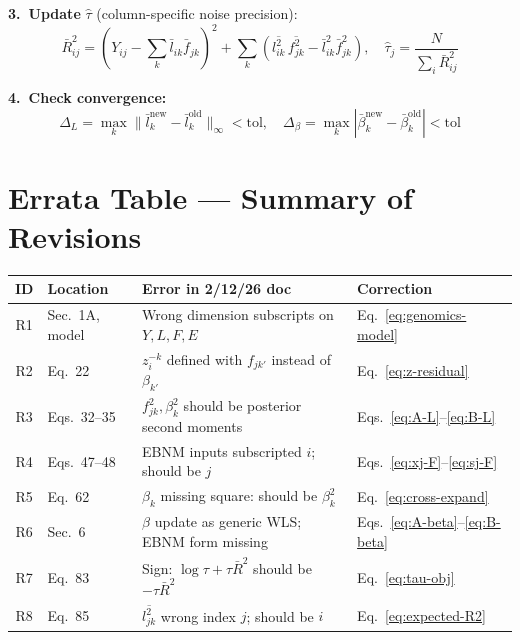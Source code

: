 \documentclass[11pt]{article}
\newcommand{\lbar}[2]{\bar{l}_{#1#2}}
\newcommand{\fbar}[2]{\bar{f}_{#1#2}}
\newcommand{\betabar}[1]{\bar{\beta}_{#1}}
\newcommand{\lsec}[2]{\overline{l^2_{#1#2}}}
\newcommand{\fsec}[2]{\overline{f^2_{#1#2}}}
\begin{document}
\begin{tcolorbox}[colback=gray!5, colframe=black!60,
                  title=Supervised Matrix Factorization --- CAVI Algorithm,
                  fonttitle=\bfseries]
\smallskip
\quad\textbf{3.\ Update} $\hat{\tau}$ (column-specific noise precision):
\[
  \bar{R}^2_{ij} = \!\left(Y_{ij} - \textstyle\sum_k \lbar{i}{k}\fbar{j}{k}\right)^{\!2}
                 + \textstyle\sum_k\!\left(\lsec{i}{k}\,\fsec{j}{k}
                   - \lbar{i}{k}^2\fbar{j}{k}^2\right),
  \quad
  \hat{\tau}_j = \frac{N}{\textstyle\sum_i \bar{R}^2_{ij}}
\]

\smallskip
\quad\textbf{4.\ Check convergence:}
\[
  \Delta_L = \max_k\|\bar{l}_k^{\text{new}} - \bar{l}_k^{\text{old}}\|_\infty < \text{tol},
  \quad
  \Delta_\beta = \max_k|\betabar{k}^{\text{new}} - \betabar{k}^{\text{old}}| < \text{tol}
\]
\end{tcolorbox}

\section{Errata Table --- Summary of Revisions}\label{sec:errata}

\begin{center}
\begin{tabular}{clll}
\toprule
ID & Location & Error in 2/12/26 doc & Correction \\
\midrule
R1 & Sec.\ 1A, model     & Wrong dimension subscripts on $Y,L,F,E$
                          & Eq.~\eqref{eq:genomics-model} \\
R2 & Eq.\ 22             & $z^{-k}_i$ defined with $f_{jk'}$ instead of $\beta_{k'}$
                          & Eq.~\eqref{eq:z-residual} \\
R3 & Eqs.\ 32--35        & $f^2_{jk},\beta^2_k$ should be posterior second moments
                          & Eqs.~\eqref{eq:A-L}--\eqref{eq:B-L} \\
R4 & Eqs.\ 47--48        & EBNM inputs subscripted $i$; should be $j$
                          & Eqs.~\eqref{eq:xj-F}--\eqref{eq:sj-F} \\
R5 & Eq.\ 62             & $\beta_k$ missing square: should be $\beta_k^2$
                          & Eq.~\eqref{eq:cross-expand} \\
R6 & Sec.\ 6             & $\beta$ update as generic WLS; EBNM form missing
                          & Eqs.~\eqref{eq:A-beta}--\eqref{eq:B-beta} \\
R7 & Eq.\ 83             & Sign: $\log\tau + \tau\bar{R}^2$ should be $-\tau\bar{R}^2$
                          & Eq.~\eqref{eq:tau-obj} \\
R8 & Eq.\ 85             & $\overline{l^2_{jk}}$ wrong index $j$; should be $i$
                          & Eq.~\eqref{eq:expected-R2} \\
\bottomrule
\end{tabular}
\end{center}
\end{document}
